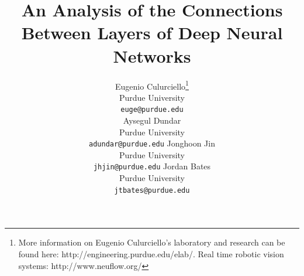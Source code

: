\documentclass{article} %
\begin{document}
\title{An Analysis of the Connections  \\ Between Layers of Deep Neural Networks}

\author{
Eugenio Culurciello\thanks{More information on Eugenio Culurciello's laboratory and research can be found here: http://engineering.purdue.edu/elab/. Real time robotic vision systems: http://www.neuflow.org/} \\
Purdue University\\
\texttt{euge@purdue.edu} \\
\And
Aysegul Dundar \\
Purdue University\\
\texttt{adundar@purdue.edu}
\AND
Jonghoon Jin \\
Purdue University\\
\texttt{jhjin@purdue.edu}
\And
Jordan Bates \\
Purdue University\\
\texttt{jtbates@purdue.edu}
}


\maketitle
\end{document}
